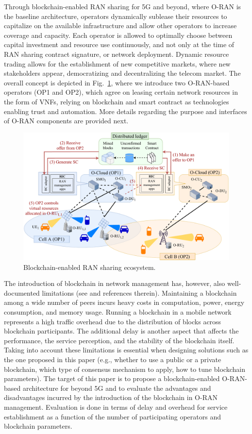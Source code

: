 \documentclass[journal]{IEEEtran}
\begin{document}
	Through blockchain-enabled RAN sharing for 5G and beyond, where O-RAN is the baseline architecture, operators dynamically sublease their resources to capitalize on the available infrastructure and allow other operators to increase coverage and capacity. Each operator is allowed to optimally choose between capital investment and resource use continuously, and not only at the time of RAN sharing contract signature, or network deployment. Dynamic resource trading allows for the establishment of new competitive markets, where new stakeholders appear, democratizing and decentralizing the telecom market. The overall concept is depicted in Fig.~\ref{fig:blockchain_ecosystem}, where we introduce two O-RAN-based operators (OP1 and OP2), which agree on leasing certain network resources in the form of VNFs, relying on blockchain and smart contract as technologies enabling trust and automation. More details regarding the purpose and interfaces of O-RAN components are provided next.
	
	\begin{figure}[ht!]
		\includegraphics[width=\linewidth]{blockchain_ran-ecosystem}
		\caption{Blockchain-enabled RAN sharing ecosystem.}
		\label{fig:blockchain_ecosystem}
	\end{figure} 
	
	The introduction of blockchain in network management has, however, also well-documented limitations (see \cite{FWilhelmi_PIMRC} and references therein). Maintaining a blockchain among a wide number of peers incurs heavy costs in computation, power, energy consumption, and memory usage. Running a blockchain in a mobile network represents a high traffic overhead due to the distribution of blocks across blockchain participants. The additional delay is another aspect that affects the performance, the service perception, and the stability of the blockchain itself. Taking into account these limitations is essential when designing solutions such as the one proposed in this paper (e.g., whether to use a public or a private blockchain, which type of consensus mechanism to apply, how to tune blockchain parameters). The target of this paper is to propose a blockchain-enabled O-RAN-based architecture for beyond 5G and to evaluate the advantages and disadvantages incurred by the introduction of the blockchain in O-RAN management. Evaluation is done in terms of delay and overhead for service establishment as a function of the number of participating operators and blockchain parameters.
	
\end{document}
